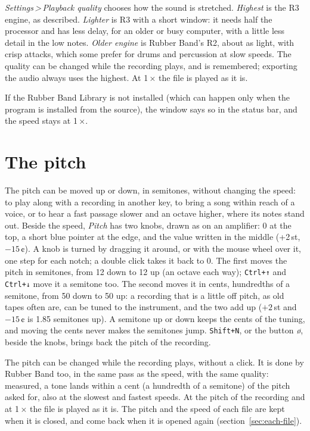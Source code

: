 \documentclass[12pt,
              article,
              oneside
              ]{memoir}
\newcommand*{\menu}[1]{\textit{#1}}
\newcommand*{\then}{\,>\,}
\newcommand*{\key}[1]{\texttt{#1}}
\begin{document}
%
\menu{Settings\then Playback quality} chooses how the sound is stretched.
\menu{Highest} is the R3 engine, as described. \menu{Lighter} is R3 with a
short window: it needs half the processor and has less delay, for an older
or busy computer, with a little less detail in the low notes. \menu{Older
engine} is Rubber Band's R2, about as light, with crisp attacks, which some
prefer for drums and percussion at slow speeds. The quality can be changed
while the recording plays, and is remembered; exporting the audio always
uses the highest. At 1\,× the
file is played as it is.

%
If the Rubber Band Library is not installed (which can happen only when the
program is installed from the source), the window says so in the status
bar, and the speed stays at 1\,×.

\section{The pitch}
\label{sec:pitch}

%
The pitch can be moved up or down, in semitones, without changing the
speed: to play along with a recording in another key, to bring a song
within reach of a voice, or to hear a fast passage slower and an octave
higher, where its notes stand out. Beside the speed, \menu{Pitch} has two
knobs, drawn as on an amplifier: 0 at the top, a short blue pointer at the
edge, and the value written in the middle (+2\,st, $-15$\,¢). A knob is turned
by dragging it around, or with the mouse wheel over it, one step for each
notch; a double click takes it back to 0. The first moves the pitch in semitones, from
12 down to 12 up (an octave each way); \key{Ctrl+↑} and \key{Ctrl+↓} move
it a semitone too. The second moves it in cents, hundredths of a
semitone, from 50 down to 50 up: a recording that is a little off pitch,
as old tapes often are, can be tuned to the instrument, and the two add
up ($+2$\,st and $-15$\,¢ is 1.85 semitones up). A semitone up or down
keeps the cents of the tuning, and moving the cents never makes the
semitones jump. \key{Shift+N}, or the button \menu{ø}, beside the knobs, brings back the
pitch of the recording.

%
The pitch can be changed while the recording plays, without a click. It
is done by Rubber Band too, in the same pass as the speed, with the same
quality: measured, a tone lands within a cent (a hundredth of a semitone)
of the pitch asked for, also at the slowest and fastest speeds. At the pitch of the
recording and at 1\,× the file is played as it is. The pitch and the
speed of each file are kept when it is closed, and come back when it is
opened again (section~\ref{sec:each-file}).
\end{document}
